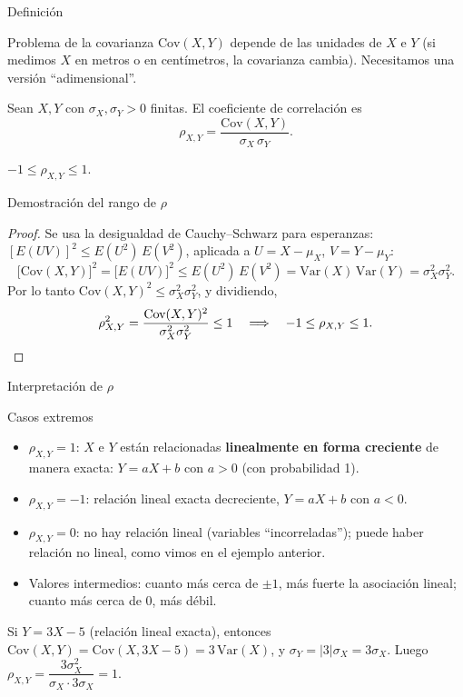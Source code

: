 \documentclass[aspectratio=169,11pt]{beamer}
\begin{document}
\begin{frame}{Definición}
\begin{block}{Problema de la covarianza}
$\text{Cov}(X,Y)$ depende de las unidades de $X$ e $Y$ (si medimos $X$ en metros o en centímetros, la covarianza cambia). Necesitamos una versión ``adimensional''.
\end{block}

\begin{definition}
Sean $X,Y$ con $\sigma_X, \sigma_Y > 0$ finitas. El coeficiente de correlación es
\[
\rho_{X,Y} = \frac{\text{Cov}(X,Y)}{\sigma_X\, \sigma_Y}.
\]
\end{definition}

\begin{theorem}[Rango]
$-1 \leq \rho_{X,Y} \leq 1$.
\end{theorem}
\end{frame}

\begin{frame}{Demostración del rango de $\rho$}
\begin{proof}
Se usa la desigualdad de Cauchy--Schwarz para esperanzas: $[E(UV)]^2 \leq E(U^2)\,E(V^2)$, aplicada a $U = X-\mu_X$, $V=Y-\mu_Y$:
\[
\big[\text{Cov}(X,Y)\big]^2 = \big[E(UV)\big]^2 \leq E(U^2)\,E(V^2) = \text{Var}(X)\,\text{Var}(Y) = \sigma_X^2 \sigma_Y^2.
\]
Por lo tanto $\text{Cov}(X,Y)^2 \leq \sigma_X^2 \sigma_Y^2$, y dividiendo,
\[
\rho_{X,Y}^2 = \frac{\text{Cov}(X,Y)^2}{\sigma_X^2\sigma_Y^2} \leq 1 \quad \Longrightarrow \quad -1 \leq \rho_{X,Y} \leq 1. \qedhere
\]
\end{proof}
\end{frame}

\begin{frame}{Interpretación de $\rho$}
\begin{block}{Casos extremos}
\begin{itemize}
\item $\rho_{X,Y} = 1$: $X$ e $Y$ están relacionadas \textbf{linealmente en forma creciente} de manera exacta: $Y = aX+b$ con $a>0$ (con probabilidad 1).
\item $\rho_{X,Y} = -1$: relación lineal exacta decreciente, $Y=aX+b$ con $a<0$.
\item $\rho_{X,Y} = 0$: no hay relación lineal (variables ``incorreladas''); puede haber relación no lineal, como vimos en el ejemplo anterior.
\item Valores intermedios: cuanto más cerca de $\pm 1$, más fuerte la asociación lineal; cuanto más cerca de $0$, más débil.
\end{itemize}
\end{block}

\begin{example}
Si $Y = 3X - 5$ (relación lineal exacta), entonces $\text{Cov}(X,Y) = \text{Cov}(X,3X-5) = 3\,\text{Var}(X)$, y $\sigma_Y = |3|\sigma_X = 3\sigma_X$. Luego $\rho_{X,Y} = \dfrac{3\sigma_X^2}{\sigma_X \cdot 3\sigma_X} = 1$.
\end{example}
\end{frame}
\end{document}
